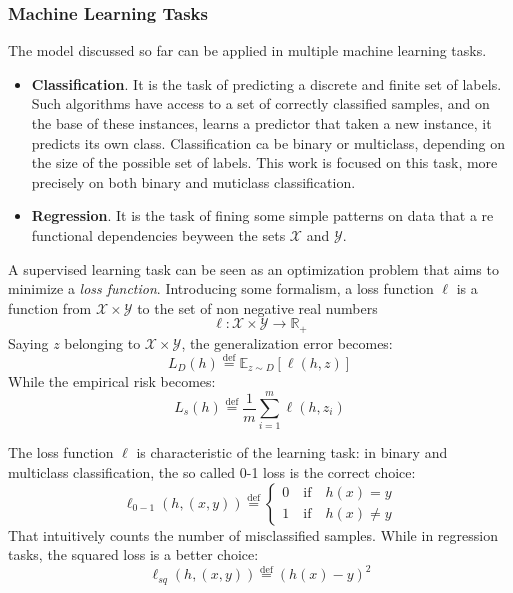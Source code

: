 \subsubsection{Machine Learning Tasks}
The model discussed so far can be applied in multiple machine learning tasks.
\begin{itemize}
	\item \textbf{Classification}. It is the task of predicting a discrete and finite set of labels. Such algorithms have access to a set of correctly classified samples, and on the base of these instances, learns a predictor that taken a new instance, it predicts its own class. Classification ca be binary or multiclass, depending on the size of the possible set of labels. This work is focused on this task, more precisely on both binary and muticlass classification.
	\item \textbf{Regression}. It is the task of fining some simple patterns on data that a re functional dependencies beyween the sets $\mathcal{X}$ and $\mathcal{Y}$.
\end{itemize}

A supervised learning task can be seen as an optimization problem that aims to minimize a \textit{loss function}. Introducing some formalism, a loss function $\ell$ is a function from $\mathcal{X} \times \mathcal{Y}$ to the set of non negative real numbers
\[\ell: \mathcal{X} \times \mathcal{Y} \rightarrow \mathbb{R}_+\]
Saying $z$ belonging to $\mathcal{X} \times \mathcal{Y}$, the generalization error becomes:
\[L_D(h) \stackrel{\text{def}}{=} \mathbb{E}_{z \sim D}[\ell (h,z)]\]
While the empirical risk becomes:
\[L_s(h)\stackrel{\text{def}}{=} \frac{1}{m} \sum_{i=1}^{m} \ell (h, z_i)\]

The loss function $\ell$ is characteristic of the learning task: in binary and multiclass classification, the so called 0-1 loss is the correct choice:
\[\ell_{0-1}(h, (x,y)) \stackrel{\text{def}}{=} 
	\begin{cases}
		0 \quad \textrm{if} \quad  h(x) = y\\
		1 \quad \textrm{if} \quad  h(x) \neq y
	\end{cases}\]
That intuitively counts the number of misclassified samples. While in regression tasks, the squared loss is a better choice:
\[\ell_{sq}(h,(x,y)) \stackrel{\text{def}}{=} (h(x)-y)^2\]




